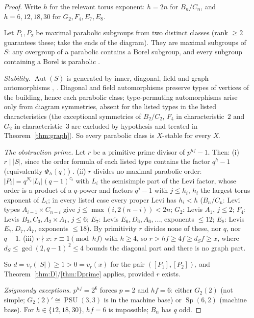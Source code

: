 \documentclass[11pt]{amsart}
\theoremstyle{definition}
\theoremstyle{remark}
\DeclareMathOperator{\Aut}{Aut}
\DeclareMathOperator{\PSU}{PSU}
\DeclareMathOperator{\Sp}{Sp}
\newcommand{\vp}[1]{v_{#1}}
\begin{document}
\begin{proof}
Write $h$ for the relevant torus exponent: $h=2n$ for $B_n/C_n$, and
$h=6,12,18,30$ for $G_2,F_4,E_7,E_8$.

Let $P_1,P_2$ be maximal parabolic subgroups from two distinct classes
(rank $\geq2$ guarantees these; take the ends of the diagram). They are
maximal subgroups of $S$: any overgroup of a parabolic contains a Borel
subgroup, and every subgroup containing a Borel is parabolic
\cite[Thms.~8.3.2, 8.4.3]{Carter}.

\emph{Stability.} $\Aut(S)$ is generated by inner, diagonal, field and
graph automorphisms \cite{Steinberg}, \cite[Ch.~12]{Carter}. Diagonal
and field automorphisms preserve types of vertices of the building,
hence each parabolic class; type-permuting automorphisms arise only from
diagram symmetries, absent for the listed types in the listed
characteristics (the exceptional symmetries of $B_2/C_2$, $F_4$ in
characteristic~$2$ and $G_2$ in characteristic~$3$ are excluded by
hypothesis and treated in Theorem~\ref{thm:graph}). So every parabolic
class is $X$-stable for every $X$.

\emph{The obstruction prime.} Let $r$ be a primitive prime divisor of
$p^{hf}-1$. Then:
(i) $r\mid|S|$, since the order formula of each listed type contains the
factor $q^h-1$ (equivalently $\Phi_h(q)$) \cite[\S14.1]{Carter}.
(ii) $r$ divides no maximal parabolic order: $|P_i|=q^{N_i}|L_i|
(q-1)^{c_i}$ with $L_i$ the semisimple part of the Levi factor, whose
order is a product of a $q$-power and factors $q^j-1$ with $j\leq h_i$,
$h_i$ the largest torus exponent of $L_i$; in every listed case every
proper Levi has $h_i<h$ ($B_n/C_n$: Levi types
$A_{i-1}\times C_{n-i}$ give $j\leq\max(i,2(n-i))<2n$; $G_2$: Levis
$A_1$, $j\leq2$; $F_4$: Levis $B_3,C_3,A_2{\times}A_1$, $j\leq6$; $E_7$:
Levis $E_6,D_6,A_6,\dots$, exponents $\leq12$; $E_8$: Levis
$E_7,D_7,A_7$, exponents $\leq18$). By primitivity $r$ divides none of
these, nor $q$, nor $q-1$.
(iii) $r\nmid x$: $r\equiv1\pmod{hf}$ with $h\geq4$, so
$r>hf\geq4f\geq d_S f\geq x$, where $d_S\leq\gcd(2,q-1)^{\,2}\leq4$
bounds the diagonal part and there is no graph part.

So $d=\vp{r}(|S|)\geq1>0=\vp{r}(x)$ for the pair $([P_1],[P_2])$, and
Theorem~\ref{thm:D}/\ref{thm:Dprime} applies, provided $r$ exists.

\emph{Zsigmondy exceptions.} $p^{hf}=2^6$ forces $p=2$ and $hf=6$:
either $G_2(2)$ (not simple; $G_2(2)'\cong\PSU(3,3)$ is in the machine
base) or $\Sp(6,2)$ (machine base). For $h\in\{12,18,30\}$, $hf=6$ is
impossible; $B_n$ has $q$ odd.
\end{proof}
\end{document}
